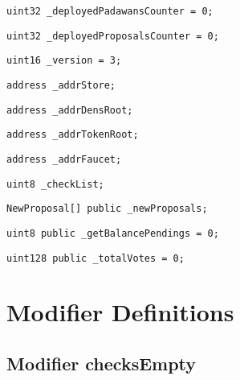 \begin{lstlisting}[firstnumber=35]
    uint32 _deployedPadawansCounter = 0;
\end{lstlisting}

\begin{lstlisting}[firstnumber=36]
    uint32 _deployedProposalsCounter = 0;
\end{lstlisting}

\begin{lstlisting}[firstnumber=37]
    uint16 _version = 3;
\end{lstlisting}

\begin{lstlisting}[firstnumber=39]
    address _addrStore;
\end{lstlisting}

\begin{lstlisting}[firstnumber=40]
    address _addrDensRoot;
\end{lstlisting}

\begin{lstlisting}[firstnumber=41]
    address _addrTokenRoot;
\end{lstlisting}

\begin{lstlisting}[firstnumber=42]
    address _addrFaucet;
\end{lstlisting}

\begin{lstlisting}[firstnumber=44]
    uint8 _checkList;
\end{lstlisting}

\begin{lstlisting}[firstnumber=46]
    NewProposal[] public _newProposals;
\end{lstlisting}

\begin{lstlisting}[firstnumber=47]
    uint8 public _getBalancePendings = 0;
\end{lstlisting}

\begin{lstlisting}[firstnumber=48]
    uint128 public _totalVotes = 0;
\end{lstlisting}

\section{Modifier Definitions}


\subsection{Modifier checksEmpty}

